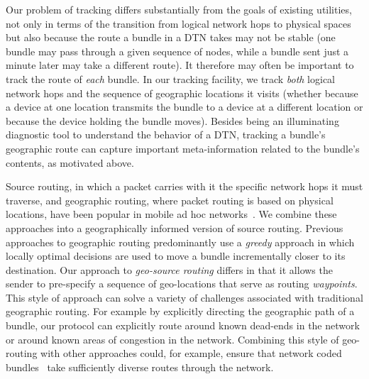 Our problem of tracking differs substantially from the goals of existing utilities, not only in terms of the transition from logical network hops to physical spaces but also because the route a bundle in a DTN takes may not be stable (one bundle may pass through a given sequence of nodes, while a bundle sent just a minute later may take a different route). It therefore may often be important to track the route of {\em each} bundle. In our tracking facility, we track {\em both} logical network hops and the sequence of geographic locations it visits (whether because a device at one location transmits the bundle to a device at a different location or because the device holding the bundle moves). Besides being an illuminating diagnostic tool to understand the behavior of a DTN, tracking a bundle's geographic route can capture important meta-information related to the bundle's contents, as motivated above. 

Source routing, in which a packet carries with it the specific network hops it must traverse, and geographic routing, where packet routing is based on physical locations, have been popular in mobile ad hoc networks~\cite{johnson96:dynamic, karp00:gpsr}. We combine these approaches into a geographically informed version of source routing. Previous approaches to geographic routing predominantly use a {\em greedy} approach in which locally optimal decisions are used to move a bundle incrementally closer to its destination. Our approach to {\em geo-source routing} differs in that it allows the sender to pre-specify a sequence of geo-locations that serve as routing {\em waypoints}. This style of approach can solve a variety of challenges associated with traditional geographic routing. For example by explicitly directing the geographic path of a bundle, our protocol can explicitly route around known dead-ends in the network or around known areas of congestion in the network. Combining this style of geo-routing with other approaches could, for example, ensure that network coded bundles~\cite{petz11:network, widmer05:network} take sufficiently diverse routes through the network.

